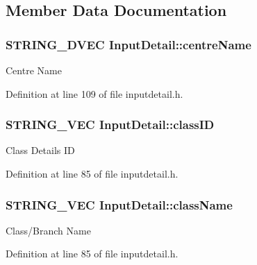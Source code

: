 \subsection{\-Member \-Data \-Documentation}
\hypertarget{classInputDetail_a44d0e743d84bfce178975192fc2ddde7}{
\subsubsection[{centre\-Name}]{\setlength{\rightskip}{0pt plus 5cm}\-S\-T\-R\-I\-N\-G\-\_\-D\-V\-E\-C {\bf \-Input\-Detail\-::centre\-Name}}}\label{db/d6e/classInputDetail_a44d0e743d84bfce178975192fc2ddde7}
\-Centre \-Name 

\-Definition at line 109 of file inputdetail.\-h.

\hypertarget{classInputDetail_a67c823f91164f534250751ab8da7b7cf}{
\subsubsection[{class\-I\-D}]{\setlength{\rightskip}{0pt plus 5cm}\-S\-T\-R\-I\-N\-G\-\_\-\-V\-E\-C {\bf \-Input\-Detail\-::class\-I\-D}}}\label{db/d6e/classInputDetail_a67c823f91164f534250751ab8da7b7cf}
\-Class \-Details \-I\-D 

\-Definition at line 85 of file inputdetail.\-h.

\hypertarget{classInputDetail_a6ee80d01e417bea608374ba83e17b425}{
\subsubsection[{class\-Name}]{\setlength{\rightskip}{0pt plus 5cm}\-S\-T\-R\-I\-N\-G\-\_\-\-V\-E\-C {\bf \-Input\-Detail\-::class\-Name}}}\label{db/d6e/classInputDetail_a6ee80d01e417bea608374ba83e17b425}
\-Class/\-Branch \-Name 

\-Definition at line 85 of file inputdetail.\-h.

